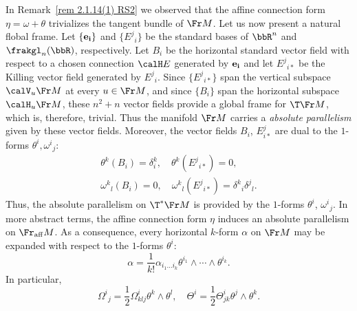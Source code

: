 \begin{rem}\label{rem 2.1.14(2) RS2}
    In Remark~\ref{rem 2.1.14(1) RS2} we observed that the affine connection form $\eta=\omega+\theta$ trivializes the tangent bundle of $\Fr M$. Let us now present a natural flobal frame. Let $\{\bf{e}_i\}$ and $\{E^j{}_i\}$ be the standard bases of $\bbR^n$ and $\frakgl_n(\bbR)$, respectively. Let $B_i$ be the horizontal standard vector field with respect to a chosen connection $\calH E$ generated by $\bf{e}_i$ and let $E^j{}_{i\ast}$ be the Killing vector field generated by $E^j{}_i$. Since $\{E^j{}_{i\ast}\}$ span the vertical subspace $\calV_u \Fr M$ at every $u\in\Fr M$, and since $\{B_i\}$ span the horizontal subspace $\calH_u \Fr M$, these $n^2+n$ vector fields provide a global frame for $\T\Fr M$, which is, therefore, trivial. Thus the manifold $\Fr M$ carries a \emph{absolute parallelism} given by these vector fields. Moreover, the vector fields $B_i$, $E^j_{i\ast}$ are dual to the $1$-forms $\theta^i,\omega^i{}_j$:
    \begin{gather}
        \theta^k(B_i)=\delta^k_i,\quad \theta^k(E^j{}_{i\ast})=0,\\
        \omega^k{}_l(B_i)=0,\quad \omega^k{}_l(E^j{}_{i\ast})=\delta^k{}_i\delta^j{}_l.
    \end{gather}
    Thus, the absolute parallelism on $\T^\ast\Fr M$ is provided by the $1$-forms $\theta^i$, $\omega^i{}_j$. In more abstract terms, the affine connection form $\eta$ induces an absolute parallelism on $\Fr_{\mathrm{aff}}M$. As a consequence, every horizontal $k$-form $\alpha$ on $\Fr M$ may be expanded with respect to the $1$-forms $\theta^i$:
    \[\alpha=\frac{1}{k!}\alpha_{i_1\ldots i_k}\theta^{i_1}\wedge \cdots\wedge \theta^{i_k}.\]
    In particular, 
    \[\Omega^i{}_j=\frac12 \Omega^i_{klj}\theta^k\wedge\theta^l,\quad \Theta^i=\frac12\Theta^i_{jk}\theta^j\wedge\theta^k.\label{eq 2.1.20 RS2}\]
\end{rem}


